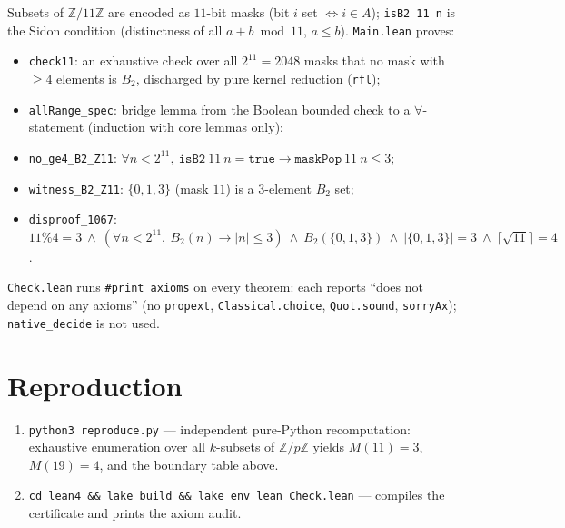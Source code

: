 \documentclass[11pt]{article}
\begin{document}
Subsets of $\mathbb{Z}/11\mathbb{Z}$ are encoded as $11$-bit masks
(bit $i$ set $\iff i\in A$); \texttt{isB2 11 n} is the Sidon condition
(distinctness of all $a+b \bmod 11$, $a\le b$).  \texttt{Main.lean} proves:
\begin{itemize}
\item \texttt{check11}: an exhaustive check over all $2^{11}=2048$ masks that no
  mask with $\ge4$ elements is $B_2$, discharged by pure kernel reduction
  (\texttt{rfl});
\item \texttt{allRange\_spec}: bridge lemma from the Boolean bounded check to a
  $\forall$-statement (induction with core lemmas only);
\item \texttt{no\_ge4\_B2\_Z11}:
  $\forall n<2^{11},\ \texttt{isB2}\ 11\ n=\texttt{true}\to \texttt{maskPop}\ 11\ n\le 3$;
\item \texttt{witness\_B2\_Z11}: $\{0,1,3\}$ (mask $11$) is a $3$-element $B_2$ set;
\item \texttt{disproof\_1067}:
  $11\%4=3\ \wedge\ (\forall n<2^{11},\ B_2(n)\to|n|\le3)\ \wedge\ B_2(\{0,1,3\})\
  \wedge\ |\{0,1,3\}|=3\ \wedge\ \lceil\sqrt{11}\rceil=4$.
\end{itemize}
\texttt{Check.lean} runs \texttt{\#print axioms} on every theorem: each reports
``does not depend on any axioms'' (no \texttt{propext}, \texttt{Classical.choice},
\texttt{Quot.sound}, \texttt{sorryAx}); \texttt{native\_decide} is not used.

\section{Reproduction}

\begin{enumerate}
\item \texttt{python3 reproduce.py} --- independent pure-Python recomputation:
      exhaustive enumeration over all $k$-subsets of $\mathbb{Z}/p\mathbb{Z}$
      yields $M(11)=3$, $M(19)=4$, and the boundary table above.
\item \texttt{cd lean4 \&\& lake build \&\& lake env lean Check.lean} ---
      compiles the certificate and prints the axiom audit.
\end{enumerate}
\end{document}

